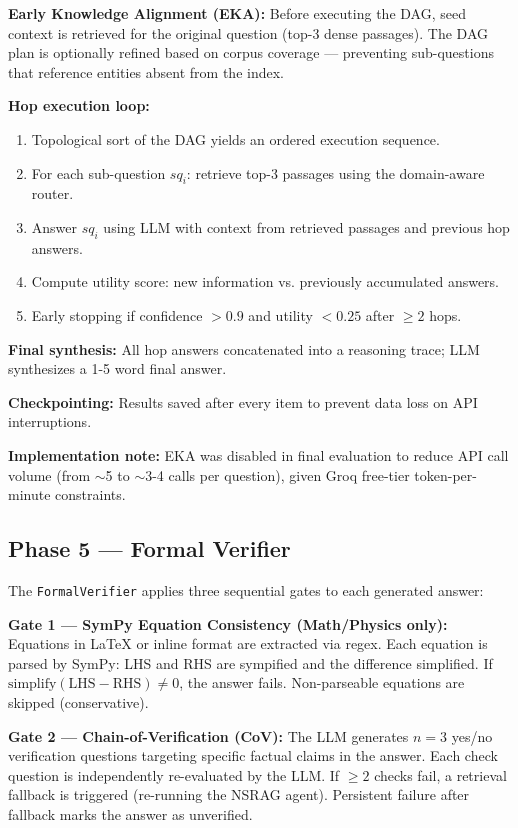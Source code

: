 \documentclass[conference]{IEEEtran}
\begin{document}
\textbf{Early Knowledge Alignment (EKA):} Before executing the DAG, seed context is retrieved for the original question (top-3 dense passages). The DAG plan is optionally refined based on corpus coverage — preventing sub-questions that reference entities absent from the index.

\textbf{Hop execution loop:}
\begin{enumerate}
    \item Topological sort of the DAG yields an ordered execution sequence.
    \item For each sub-question $sq_i$: retrieve top-3 passages using the domain-aware router.
    \item Answer $sq_i$ using LLM with context from retrieved passages and previous hop answers.
    \item Compute utility score: new information vs. previously accumulated answers.
    \item Early stopping if confidence $> 0.9$ and utility $< 0.25$ after $\geq 2$ hops.
\end{enumerate}

\textbf{Final synthesis:} All hop answers concatenated into a reasoning trace; LLM synthesizes a 1-5 word final answer.

\textbf{Checkpointing:} Results saved after every item to prevent data loss on API interruptions.

\textbf{Implementation note:} EKA was disabled in final evaluation to reduce API call volume (from $\sim$5 to $\sim$3-4 calls per question), given Groq free-tier token-per-minute constraints.

\subsection{Phase 5 — Formal Verifier}
\label{sec:phase5}

The \texttt{FormalVerifier} applies three sequential gates to each generated answer:

\textbf{Gate 1 — SymPy Equation Consistency (Math/Physics only):}
Equations in LaTeX or inline format are extracted via regex. Each equation is parsed by SymPy: LHS and RHS are sympified and the difference simplified. If $\text{simplify}(\text{LHS} - \text{RHS}) \neq 0$, the answer fails. Non-parseable equations are skipped (conservative).

\textbf{Gate 2 — Chain-of-Verification (CoV):}
The LLM generates $n=3$ yes/no verification questions targeting specific factual claims in the answer. Each check question is independently re-evaluated by the LLM. If $\geq 2$ checks fail, a retrieval fallback is triggered (re-running the NSRAG agent). Persistent failure after fallback marks the answer as unverified.
\end{document}
